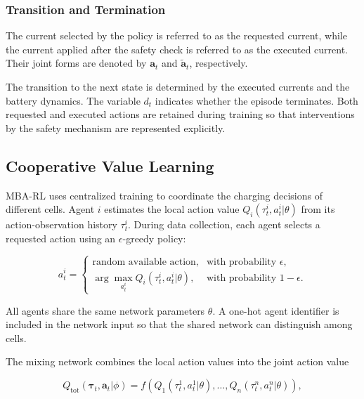 \documentclass[10pt,journal,letterpaper]{IEEEtran}
\begin{document}
\subsubsection{Transition and Termination}

The current selected by the policy is referred to as the requested current, while the current applied after the safety check is referred to as the executed current. Their joint forms are denoted by $\mathbf{a}_t$ and $\tilde{\mathbf{a}}_t$, respectively.

The transition to the next state is determined by the executed currents and the battery dynamics. The variable $d_t$ indicates whether the episode terminates. Both requested and executed actions are retained during training so that interventions by the safety mechanism are represented explicitly.

\subsection{Cooperative Value Learning}

MBA-RL uses centralized training to coordinate the charging decisions of different cells. Agent $i$ estimates the local action value $Q_i(\tau_t^i,a_t^i|\theta)$ from its action-observation history $\tau_t^i$. During data collection, each agent selects a requested action using an $\epsilon$-greedy policy:

\begin{equation}
\label{epsilon-greedy}
a_t^i =
\begin{cases}
\text{random available action},
& \text{with probability }\epsilon,\\
\displaystyle
\arg\max_{a_t^i}
Q_i(\tau_t^i,a_t^i|\theta),
& \text{with probability }1-\epsilon.
\end{cases}
\end{equation}

All agents share the same network parameters $\theta$. A one-hot agent identifier is included in the network input so that the shared network can distinguish among cells.

The mixing network combines the local action values into the joint action value

\begin{equation}
\label{Q-value}
Q_{\mathrm{tot}}
(\boldsymbol{\tau}_t,\mathbf{a}_t|\phi)
=
f\left(
Q_1(\tau_t^1,a_t^1|\theta),
\ldots,
Q_n(\tau_t^n,a_t^n|\theta)
\right),
\end{equation}
\end{document}
